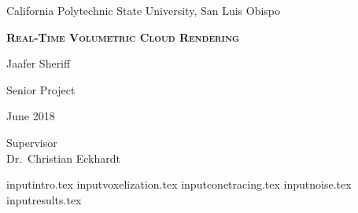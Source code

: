 \documentclass{article}
\begin{document}
\begin{center}
{\scshape
    {\LARGE California Polytechnic State University, San Luis Obispo \par}
    \vspace{3cm}
    {\huge\scshape\bfseries Real-Time Volumetric Cloud Rendering\par}
    \vspace{1.5cm}
    {\Large Jaafer Sheriff\par}
    \vspace{0.75cm}
    {\large Senior Project\par}
    \vspace{2cm}
    {\large June 2018\par}
    \vfill
    {\large Supervisor\\
    Dr.~Christian Eckhardt\par}
}
\end{center}



\newpage
\tableofcontents

input{intro.tex}
input{voxelization.tex}
input{conetracing.tex}
input{noise.tex}
input{results.tex}
\end{document}
